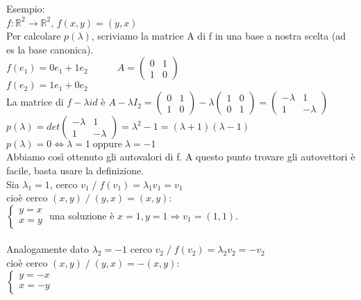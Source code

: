 \documentclass[12pt]{article}
\begin{document}
\noindent Esempio:\\
$f:\mathbb{R}^2 \longrightarrow \mathbb{R}^2$, $f(x,y)=(y,x)$\\
Per calcolare $p(\lambda)$, scriviamo la matrice A di f in una base a nostra scelta (ad es la base canonica).\\
$f(e_1) = 0e_1 + 1 e_2 \quad\quad\quad A= \begin{pmatrix}
    0 & 1\\
    1 & 0
\end{pmatrix}$\\
$f(e_2) = 1e_1 + 0e_2$\\
La matrice di $f-\lambda id$ è $A-\lambda I_2 = \begin{pmatrix}
    0 & 1\\
    1 & 0
\end{pmatrix} -\lambda \begin{pmatrix}
    1 & 0\\
    0 & 1
\end{pmatrix} = \begin{pmatrix}
    -\lambda & 1\\
    1 & -\lambda
\end{pmatrix}$\\
$p(\lambda) = det\begin{pmatrix}
    -\lambda & 1\\
    1 & -\lambda
\end{pmatrix} = \lambda^2 - 1 = (\lambda+1)(\lambda-1)$\\
$p(\lambda) = 0 \iff \lambda = 1 \;\text{oppure}\;\lambda = -1$\\
Abbiamo così ottenuto gli autovalori di f. A questo punto trovare gli autovettori è facile, basta usare la definizione.\\
Sia $\lambda_1 = 1$, cerco $v_1 \;/\; f(v_1) = \lambda_1v_1 = v_1$\\
cioè cerco $(x,y) \;/\; (y,x) = (x,y)$:\\
$\begin{cases}
    y = x\\
    x = y
\end{cases}$
una soluzione è $x = 1, y = 1\Longrightarrow v_1 = (1,1).$\\\\
Analogamente dato $\lambda_2 = -1$ cerco $v_2 \;/\; f(v_2) = \lambda_2v_2 = -v_2$\\
cioè cerco $(x,y) \;/\; (y,x) = -(x,y)$:\\
$\begin{cases}
    y = -x\\
    x = -y
\end{cases}$ 
\end{document}
